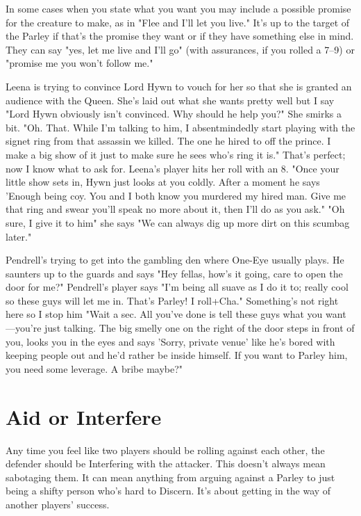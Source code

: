        

In some cases when you state what you want you may include a possible promise for the creature to make, as in "Flee and I'll let you live." It's up to the target of the Parley if that's the promise they want or if they have something else in mind. They can say "yes, let me live and I'll go" (with assurances, if you rolled a 7–9) or "promise me you won't follow me."

       
\startExample
Leena is trying to convince Lord Hywn to vouch for her so that she is granted an audience with the Queen. She's laid out what she wants pretty well but I say "Lord Hywn obviously isn't convinced. Why should he help you?" She smirks a bit. "Oh. That. While I'm talking to him, I absentmindedly start playing with the signet ring from that assassin we killed. The one he hired to off the prince. I make a big show of it just to make sure he sees who's ring it is." That's perfect; now I know what to ask for. Leena's player hits her roll with an 8. "Once your little show sets in, Hywn just looks at you coldly. After a moment he says 'Enough being coy. You and I both know you murdered my hired man. Give me that ring and swear you'll speak no more about it, then I'll do as you ask." "Oh sure, I give it to him" she says "We can always dig up more dirt on this scumbag later."
\stopExample
       
\startExample
Pendrell's trying to get into the gambling den where One-Eye usually plays. He saunters up to the guards and says "Hey fellas, how's it going, care to open the door for me?" Pendrell's player says "I'm being all suave as I do it to; really cool so these guys will let me in. That's Parley! I roll+Cha." Something's not right here so I stop him "Wait a sec. All you've done is tell these guys what you want—you're just talking. The big smelly one on the right of the door steps in front of you, looks you in the eyes and says 'Sorry, private venue' like he's bored with keeping people out and he'd rather be inside himself. If you want to Parley him, you need some leverage. A bribe maybe?"
\stopExample
       
\section{Aid or Interfere}    
       

Any time you feel like two players should be rolling against each other, the defender should be Interfering with the attacker. This doesn't always mean sabotaging them. It can mean anything from arguing against a Parley to just being a shifty person who's hard to Discern. It's about getting in the way of another players' success.

